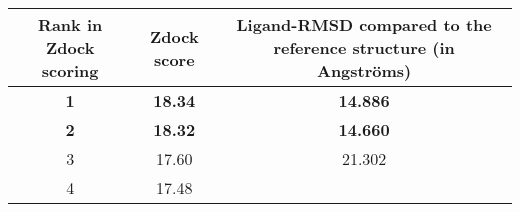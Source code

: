 \documentclass[11pt]{article}
\begin{document}
\begin{longtable}[]{@{}ccc@{}}
\toprule
\begin{minipage}[b]{0.19\columnwidth}\centering\strut
Rank in Zdock scoring\strut
\end{minipage} & \begin{minipage}[b]{0.22\columnwidth}\centering\strut
Zdock score\strut
\end{minipage} & \begin{minipage}[b]{0.49\columnwidth}\centering\strut
Ligand-RMSD compared to the reference structure (in Angströms)\strut
\end{minipage}\tabularnewline
\midrule
\endhead
\begin{minipage}[t]{0.19\columnwidth}\centering\strut
\textbf{1}\strut
\end{minipage} & \begin{minipage}[t]{0.22\columnwidth}\centering\strut
\textbf{18.34}\strut
\end{minipage} & \begin{minipage}[t]{0.49\columnwidth}\centering\strut
\textbf{14.886}\strut
\end{minipage}\tabularnewline
\begin{minipage}[t]{0.19\columnwidth}\centering\strut
\textbf{2}\strut
\end{minipage} & \begin{minipage}[t]{0.22\columnwidth}\centering\strut
\textbf{18.32}\strut
\end{minipage} & \begin{minipage}[t]{0.49\columnwidth}\centering\strut
\textbf{14.660}\strut
\end{minipage}\tabularnewline
\begin{minipage}[t]{0.19\columnwidth}\centering\strut
3\strut
\end{minipage} & \begin{minipage}[t]{0.22\columnwidth}\centering\strut
17.60\strut
\end{minipage} & \begin{minipage}[t]{0.49\columnwidth}\centering\strut
21.302\strut
\end{minipage}\tabularnewline
\begin{minipage}[t]{0.19\columnwidth}\centering\strut
4\strut
\end{minipage} & \begin{minipage}[t]{0.22\columnwidth}\centering\strut
17.48\strut
\end{minipage} & \begin{minipage}[t]{0.49\columnwidth}\centering\strut

\end{minipage}
\end{longtable}
\end{document}
